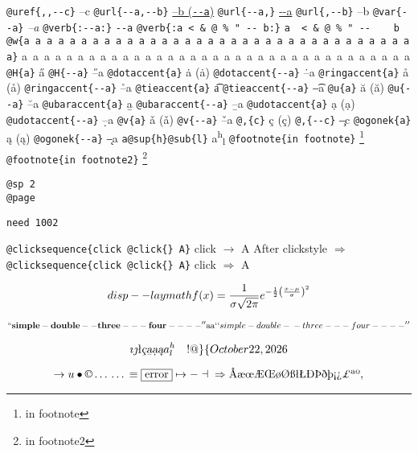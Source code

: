 \documentclass{book}
\newcommand\Texinfocommandstyletextvar[1]{{\normalfont{}\textsl{#1}}}%
\renewcommand{\_}{\Texinfounderscore\discretionary{}{}{}}
\begin{document}
\texttt{@uref\{{,}{,}{-}{-}c\}} --c
\texttt{@url\{{-}{-}a,{-}{-}b\}} \href{--a}{--b (\nolinkurl{--a})}
\texttt{@url\{{-}{-}a,\}} \url{--a}
\texttt{@url\{,{-}{-}b\}} --b
\texttt{@var\{{-}{-}a\}} \Texinfocommandstyletextvar{--a}
\texttt{@verb\{:{-}{-}a:\}} \verb:--a:
\texttt{@verb\{:a  < \& @\ \% " {-}{-}    b:\}} \verb:a  < & @ % " --    b:
\texttt{@w\{a a a a a a a a a a a a a a a a a a a a a a a a a a a a a a a a a a a\}} \hbox{a a a a a a a a a a a a a a a a a a a a a a a a a a a a a a a a a a a}
\texttt{@H\{a\}} \H{a}
\texttt{@H\{{-}{-}a\}} \H{--a}
\texttt{@dotaccent\{a\}} \.{a} (ȧ)
\texttt{@dotaccent\{{-}{-}a\}} \.{--a}
\texttt{@ringaccent\{a\}} \r{a} (å)
\texttt{@ringaccent\{{-}{-}a\}} \r{--a}
\texttt{@tieaccent\{a\}} \t{a}
\texttt{@tieaccent\{{-}{-}a\}} \t{--a}
\texttt{@u\{a\}} \u{a} (ă)
\texttt{@u\{{-}{-}a\}} \u{--a}
\texttt{@ubaraccent\{a\}} \b{a}
\texttt{@ubaraccent\{{-}{-}a\}} \b{--a}
\texttt{@udotaccent\{a\}} \d{a} (ạ)
\texttt{@udotaccent\{{-}{-}a\}} \d{--a}
\texttt{@v\{a\}} \v{a} (ǎ)
\texttt{@v\{{-}{-}a\}} \v{--a}
\texttt{@,\{c\}} \c{c} (ç)
\texttt{@,\{{-}{-}c\}} \c{--c}
\texttt{@ogonek\{a\}} \k{a} (ą)
\texttt{@ogonek\{{-}{-}a\}} \k{--a}
\texttt{a@sup\{h\}@sub\{l\}} a\textsuperscript{h}\textsubscript{l}
\texttt{@footnote\{in footnote\}} \footnote{in footnote}
\texttt{@footnote\{in footnote2\}} \footnote{in footnote2}

\texttt{@sp 2}\leavevmode{}\\
\baselineskip %
\texttt{@page}\leavevmode{}\\
\newpage{}%
\phantom{blabla}%

\texttt{need 1002}
\needspace{1.002pt}%

\texttt{@clicksequence\{click @click\{\}\ A\}} click $\rightarrow{}$ A
After clickstyle $\Rightarrow{}$
\texttt{@clicksequence\{click @click\{\}\ A\}} click $\Rightarrow{}$ A


\[
disp--laymath
f(x) = {1 \over \sigma \sqrt{2\pi}}e^{-{1 \over 2}\left({x-\mu \over \sigma}\right)^2}
\]

\[
\mathbf{``simple-double--three---four----''} \hbox{aa}
`\hbox{}`simple-double-\hbox{}-three---four----'\hbox{}'
\]

\[
\imath{} \jmath{}
\mathord{\text{\l{}}} \textsl{\c{c}}
\textsl{\b{a}} \textsl{\d{a}} \textsl{\k{a}} a^{h}_{l}
 \ {}\ {} \ {}\-{}  ! @ \} \{ 
\today{}
\]

\[
\rightarrow{}
u
\bullet{} \copyright{} \dots{} \dots{} \equiv{}
\fbox{error} \mapsto{} - \dashv{} \Rightarrow{}
\mathord{\text{\AA{}}} \mathord{\text{\ae{}}} \mathord{\text{\oe{}}} \mathord{\text{\AE{}}} \mathord{\text{\OE{}}} \mathord{\text{\o{}}} \mathord{\text{\O{}}} \mathord{\text{\ss{}}} \mathord{\text{\l{}}} \mathord{\text{\L{}}} \mathord{\text{\DH{}}}
\mathord{\text{\TH{}}} \mathord{\text{\dh{}}} \mathord{\text{\th{}}} \mathord{\text{\textexclamdown{}}} \mathord{\text{\textquestiondown{}}} \mathsterling{}
\mathord{\text{\textordfeminine{}}} \mathord{\text{\textordmasculine{}}} , 
\]
\end{document}

